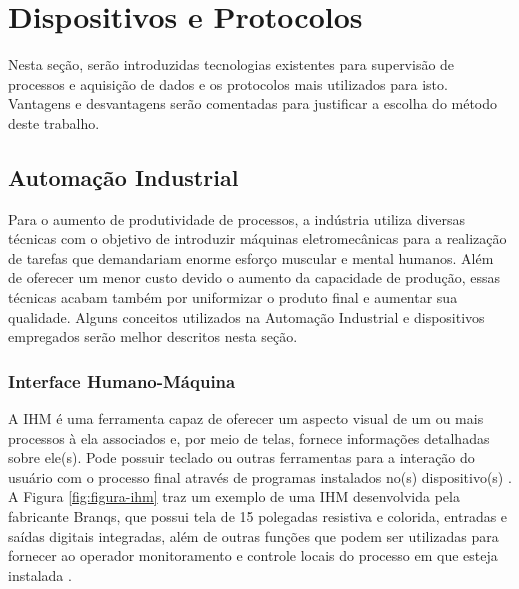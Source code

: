 \chapter{Dispositivos e Protocolos}
\label{chap:dispositivos-protocolos}

Nesta seção, serão introduzidas tecnologias existentes para supervisão de processos e aquisição de dados e os protocolos mais utilizados para isto. Vantagens e desvantagens serão comentadas para justificar a escolha do método deste trabalho.

    \section{Automação Industrial}        
    \label{sec:automacao-industrial}
    
    Para o aumento de produtividade de processos, a indústria utiliza diversas técnicas com o objetivo de introduzir máquinas eletromecânicas para a realização de tarefas que demandariam enorme esforço muscular e mental humanos. Além de oferecer um menor custo devido o aumento da capacidade de produção, essas técnicas acabam também por uniformizar o produto final e aumentar sua qualidade. Alguns conceitos utilizados na Automação Industrial e dispositivos empregados serão melhor descritos nesta seção.
    
    \subsection{Interface Humano-Máquina}
    \label{sec:ihm}

        A \gls{IHM} é uma ferramenta capaz de oferecer um aspecto visual de um ou mais processos à ela associados e, por meio de telas, fornece informações detalhadas sobre ele(s). Pode possuir teclado ou outras ferramentas para a interação do usuário com o processo final através de programas instalados no(s) dispositivo(s) \cite{mamede-instalacoes}. A Figura \ref{fig:figura-ihm} traz um exemplo de uma \gls{IHM} desenvolvida pela fabricante Branqs, que possui tela de 15 polegadas resistiva e colorida, entradas e saídas digitais integradas, além de outras funções que podem ser utilizadas para fornecer ao operador monitoramento e controle locais do processo em que esteja instalada \cite{Branqs}.
        

